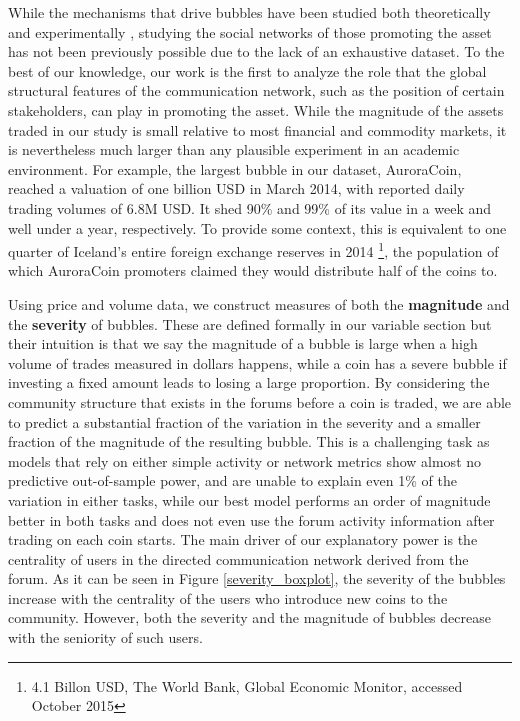 While the mechanisms that drive bubbles have been studied both theoretically 
\cite{abolafia1988enacting,earl2007decision,bakker2010social,harras2011grow}
and experimentally
\cite{moinas2013bubble},
studying the social networks of those promoting the asset has not been previously possible due to the lack of an exhaustive dataset. To the best of our knowledge, our work is the first to analyze the role that the global structural features of the communication network, such as the position of certain stakeholders, can play in promoting the asset.
While the magnitude of the assets traded in our study is small relative to most financial and commodity markets, it is nevertheless much larger than
any plausible experiment in an academic environment.
For example, the largest bubble in our dataset, AuroraCoin, reached a valuation of one billion USD in March 2014,
with reported daily trading volumes of 6.8M USD. It shed 90\% and 99\% of its value in a week and well under a year, respectively.
To provide some context, this is equivalent to one quarter of Iceland's entire foreign exchange reserves in 2014 \footnote{4.1 Billon USD, The World Bank, Global Economic Monitor, accessed October 2015}, the population of which AuroraCoin promoters claimed they would distribute half of the coins to.

Using price and volume data, we construct measures of both the \textbf{magnitude} and the \textbf{severity} of bubbles.
These are defined formally in our variable section %
but their intuition is that we say the magnitude of a bubble is large when a high volume of trades measured in dollars happens,
while a coin has a severe bubble if investing a fixed amount leads to losing a large proportion. 
By considering the community structure that exists in the forums before a coin is traded, we are able to predict a substantial fraction of the variation in the severity and a smaller fraction of the magnitude of the resulting bubble.
This is a challenging task as models that rely on either simple activity or network metrics show almost no predictive out-of-sample power, and are unable to explain even 1\% of the variation in either tasks,
while our best model performs an order of magnitude better in both tasks and does not even use the forum activity information after trading on each coin starts. 
The main driver of our explanatory power is the centrality of users in the directed communication network derived from the forum. As it can be seen in Figure \ref{severity_boxplot}, the severity of the bubbles increase with the centrality of the users who introduce new coins to the community. However, both the severity and the magnitude of bubbles decrease with the seniority of such users.

